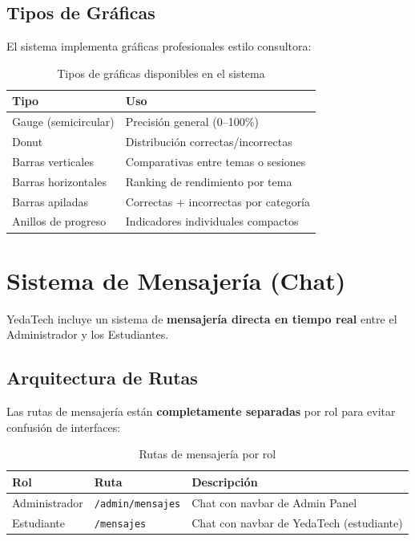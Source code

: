 \documentclass[12pt, a4paper, oneside]{book}
\begin{document}
\section{Tipos de Gráficas}

El sistema implementa gráficas profesionales estilo consultora:

\begin{table}[H]
\centering
\renewcommand{\arraystretch}{1.3}
\begin{tabularx}{\textwidth}{l X}
    \toprule
    \textbf{Tipo} & \textbf{Uso} \\
    \midrule
    Gauge (semicircular) & Precisión general (0--100\%) \\
    Donut & Distribución correctas/incorrectas \\
    Barras verticales & Comparativas entre temas o sesiones \\
    Barras horizontales & Ranking de rendimiento por tema \\
    Barras apiladas & Correctas + incorrectas por categoría \\
    Anillos de progreso & Indicadores individuales compactos \\
    \bottomrule
\end{tabularx}
\caption{Tipos de gráficas disponibles en el sistema}
\end{table}


\chapter{Sistema de Mensajería (Chat)}

YedaTech incluye un sistema de \textbf{mensajería directa en tiempo real} entre el Administrador y los Estudiantes.

\section{Arquitectura de Rutas}

\begin{importantebox}
    Las rutas de mensajería están \textbf{completamente separadas} por rol para evitar confusión de interfaces:
\end{importantebox}

\begin{table}[H]
\centering
\renewcommand{\arraystretch}{1.3}
\begin{tabularx}{\textwidth}{l l X}
    \toprule
    \textbf{Rol} & \textbf{Ruta} & \textbf{Descripción} \\
    \midrule
    Administrador & \texttt{/admin/mensajes} & Chat con navbar de Admin Panel \\
    Estudiante & \texttt{/mensajes} & Chat con navbar de YedaTech (estudiante) \\
    \bottomrule
\end{tabularx}
\caption{Rutas de mensajería por rol}
\end{table}
\end{document}
